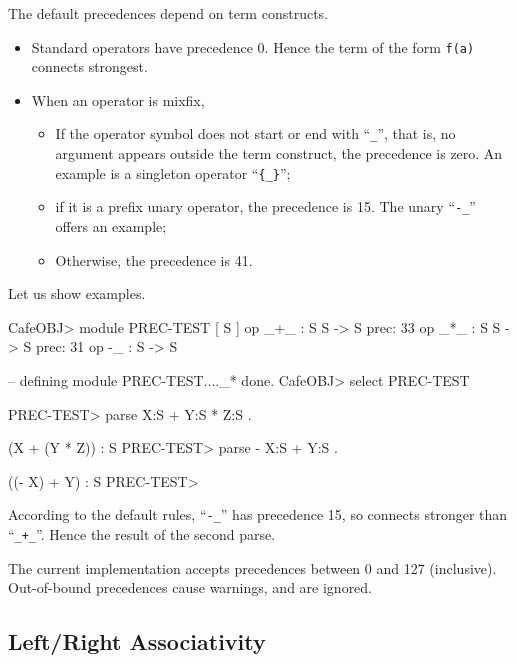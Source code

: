 \documentclass[a4paper]{memoir}
\begin{document}
The default precedences depend on term constructs.
\begin{itemize}
\item Standard operators have precedence 0. Hence the term of
 the form \verb|f(a)| connects strongest.
\item When an operator is mixfix,
 \begin{itemize}
 \item If the operator symbol does not start or end with ``\verb|_|'',
  that is,
  no argument appears outside the term construct, the precedence is zero.
  An example is a singleton operator ``\verb|{_}|'';
 \item if it is a prefix unary operator, the precedence is 15.
  The unary ``\verb|-_|'' offers an example;
 \item Otherwise, the precedence is 41.
 \end{itemize}
\end{itemize}
Let us show examples.
\begin{vvtm}
\begin{ccode}
  CafeOBJ> module PREC-TEST {
    [ S ]
    op _+_ : S S -> S { prec: 33 }
    op _*_ : S S -> S { prec: 31 }
    op -_ : S -> S
    }

  -- defining module PREC-TEST...._* done.
  CafeOBJ> select PREC-TEST

  PREC-TEST> parse X:S + Y:S * Z:S .

  (X + (Y * Z)) : S
  PREC-TEST> parse - X:S + Y:S .

  ((- X) + Y) : S
  PREC-TEST>       
\end{ccode}
\end{vvtm}
According to the default rules, ``\verb|-_|'' has precedence 15,
so connects stronger than ``\verb|_+_|''. Hence the result of the
second parse.

\begin{warning}
  The current implementation accepts precedences between 0 and
  127 (inclusive). Out-of-bound precedences cause warnings,
  and are ignored.
\end{warning}

\subsection{Left/Right Associativity}
\end{document}
